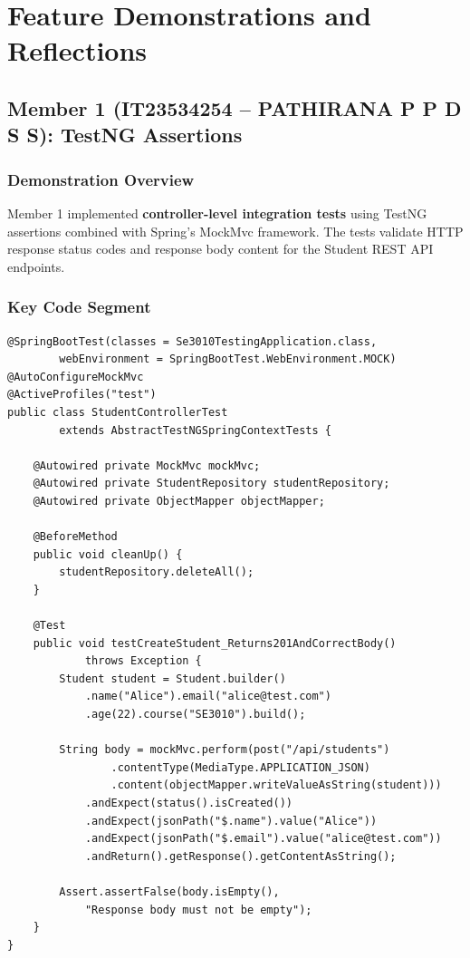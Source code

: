 \documentclass[12pt,a4paper]{article}
\begin{document}
\section{Feature Demonstrations and Reflections}

\subsection{Member 1 (IT23534254 -- PATHIRANA P P D S S): TestNG Assertions}

\subsubsection{Demonstration Overview}

Member 1 implemented \textbf{controller-level integration tests} using TestNG assertions combined with Spring's MockMvc framework. The tests validate HTTP response status codes and response body content for the Student REST API endpoints.

\subsubsection{Key Code Segment}

\begin{lstlisting}[style=javastyle, caption={Controller assertion test -- verifying HTTP 201 Created}]
@SpringBootTest(classes = Se3010TestingApplication.class,
        webEnvironment = SpringBootTest.WebEnvironment.MOCK)
@AutoConfigureMockMvc
@ActiveProfiles("test")
public class StudentControllerTest
        extends AbstractTestNGSpringContextTests {

    @Autowired private MockMvc mockMvc;
    @Autowired private StudentRepository studentRepository;
    @Autowired private ObjectMapper objectMapper;

    @BeforeMethod
    public void cleanUp() {
        studentRepository.deleteAll();
    }

    @Test
    public void testCreateStudent_Returns201AndCorrectBody()
            throws Exception {
        Student student = Student.builder()
            .name("Alice").email("alice@test.com")
            .age(22).course("SE3010").build();

        String body = mockMvc.perform(post("/api/students")
                .contentType(MediaType.APPLICATION_JSON)
                .content(objectMapper.writeValueAsString(student)))
            .andExpect(status().isCreated())
            .andExpect(jsonPath("$.name").value("Alice"))
            .andExpect(jsonPath("$.email").value("alice@test.com"))
            .andReturn().getResponse().getContentAsString();

        Assert.assertFalse(body.isEmpty(),
            "Response body must not be empty");
    }
}
\end{lstlisting}
\end{document}
